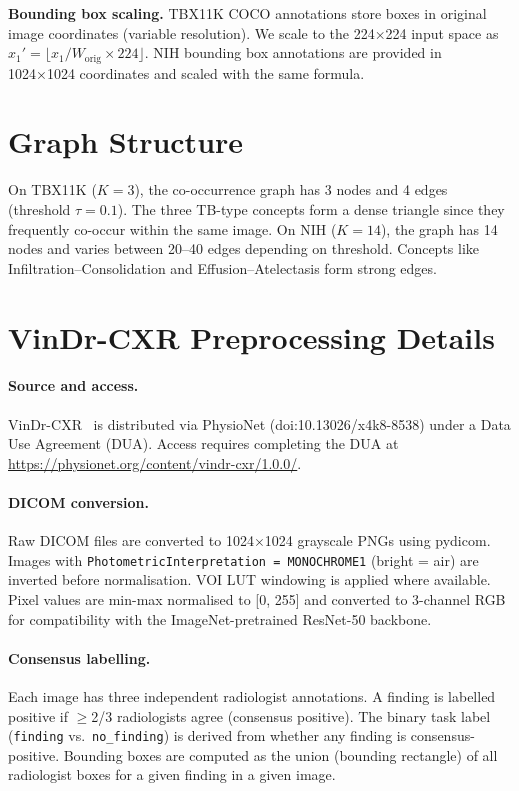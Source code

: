 \documentclass{article}
\begin{document}
\textbf{Bounding box scaling.}
TBX11K COCO annotations store boxes in original image coordinates (variable resolution). We scale to the 224×224 input space as $x_1' = \lfloor x_1 / W_\text{orig} \times 224 \rfloor$. NIH bounding box annotations are provided in 1024×1024 coordinates and scaled with the same formula.

\section{Graph Structure}
\label{app:graph}

On TBX11K ($K=3$), the co-occurrence graph has 3 nodes and 4 edges (threshold $\tau=0.1$). The three TB-type concepts form a dense triangle since they frequently co-occur within the same image. On NIH ($K=14$), the graph has 14 nodes and varies between 20--40 edges depending on threshold. Concepts like Infiltration–Consolidation and Effusion–Atelectasis form strong edges.

\section{VinDr-CXR Preprocessing Details}
\label{app:vindrcxr}

\paragraph{Source and access.}
VinDr-CXR~\cite{vindrcxr2022} is distributed via PhysioNet (doi:10.13026/x4k8-8538) under a Data Use Agreement (DUA). Access requires completing the DUA at \url{https://physionet.org/content/vindr-cxr/1.0.0/}.

\paragraph{DICOM conversion.}
Raw DICOM files are converted to 1024$\times$1024 grayscale PNGs using pydicom. Images with \texttt{PhotometricInterpretation = MONOCHROME1} (bright = air) are inverted before normalisation. VOI LUT windowing is applied where available. Pixel values are min-max normalised to [0, 255] and converted to 3-channel RGB for compatibility with the ImageNet-pretrained ResNet-50 backbone.

\paragraph{Consensus labelling.}
Each image has three independent radiologist annotations. A finding is labelled positive if $\geq$2/3 radiologists agree (consensus positive). The binary task label (\texttt{finding} vs.\ \texttt{no\_finding}) is derived from whether any finding is consensus-positive.
Bounding boxes are computed as the union (bounding rectangle) of all radiologist boxes for a given finding in a given image.
\end{document}

